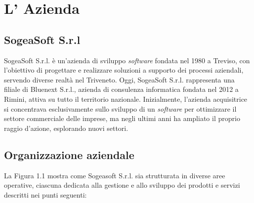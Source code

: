 \chapter{L' Azienda}
    \section{SogeaSoft S.r.l}
    SogeaSoft S.r.l. è un'azienda di sviluppo \textit{software} fondata nel 1980 a Treviso, con l'obiettivo di progettare e realizzare soluzioni a supporto dei processi aziendali, servendo diverse realtà nel Triveneto.
    Oggi, SogeaSoft S.r.l. rappresenta una filiale di Bluenext S.r.l., azienda di consulenza informatica fondata nel 2012 a Rimini, attiva su tutto il territorio nazionale. Inizialmente, l'azienda acquisitrice si concentrava esclusivamente sullo sviluppo di un \textit{software} per ottimizzare il settore commerciale delle imprese, ma negli ultimi anni ha ampliato il proprio raggio d'azione, esplorando nuovi settori.
    
    \section{Organizzazione aziendale}
    La Figura 1.1 mostra come Sogeasoft S.r.l. sia strutturata in diverse aree operative, ciascuna dedicata alla gestione e allo sviluppo dei prodotti e servizi descritti nei punti seguenti: 
    
